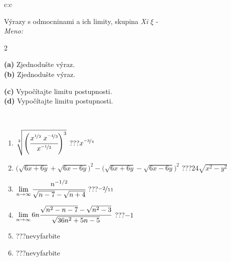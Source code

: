 \documentclass[10pt]{report}
\begin{document}
\begin{tabular}{c:c}
\begin{minipage}[c][104.5mm][t]{0.5\linewidth}
\begin{center}
\vspace{7mm}
{\huge {\Large Výrazy s odmocninami a ich limity}, skupina \textit{Xi $\xi$} -}\\[5mm]
\textit{Meno:}\phantom{xxxxxxxxxxxxxxxxxxxxxxxxxxxxxxxxxxxxxxxxxxxxxxxxxxxxxxxxxxxxxxxxx}\\[5mm]
\begin{minipage}{0.95\linewidth}
\begin{center}
{\small \begin{multicols}{2} \raggedright
\phantom{xxxxxxxxx}\textbf{(a)} Zjednodušte výraz. \\[1mm]
\phantom{xxxxxxxxx}\textbf{(b)} Zjednodušte výraz. \par \columnbreak
\textbf{(c)} Vypočítajte limitu postupnosti. \\[1mm]
\textbf{(d)} Vypočítajte limitu postupnosti.
\end{multicols}
}
\end{center}
\end{minipage}
\\[4mm]
\begin{minipage}{0.79\linewidth}
\begin{center}
\begin{varwidth}{\linewidth}
\begin{enumerate}
\small
\item $\sqrt[2]{\left(\cfrac{x^{\nicefrac{1}{3}}\;x^{\nicefrac{-4}{3}}}{x^{\nicefrac{-1}{2}}}\right)^{3}}$\quad \dotfill\; ???\;\dotfill \quad $x^{\nicefrac{-3}{4}}$
\item {\footnotesize{\scriptsize$\big(\sqrt{6x+6y}+\sqrt{6x-6y}\big)^2-\big(\sqrt{6x+6y}-\sqrt{6x-6y}\big)^2$}\quad \dotfill\; ???\;\dotfill \quad $24\sqrt{x^2-y^2}$}
\item $\lim\limits_{n\to\infty}\cfrac{n^{-1/2}}{\sqrt{n-7}-\sqrt{n+4}}$\quad \dotfill\; ???\;\dotfill \quad $\nicefrac{-2}{11}$
\item $\lim\limits_{n\to\infty}6n\cfrac{\sqrt{n^2-n-7}-\sqrt{n^2-3}}{\sqrt{36n^2+5n-5}}$\quad \dotfill\; ???\;\dotfill \quad $-1$
\item \quad \dotfill\; ???\;\dotfill \quad nevyfarbite
\item \quad \dotfill\; ???\;\dotfill \quad nevyfarbite
\end{enumerate}
\end{varwidth}

\end{center}
\end{minipage}
\end{center}
\end{minipage}
\end{tabular}
\end{document}
